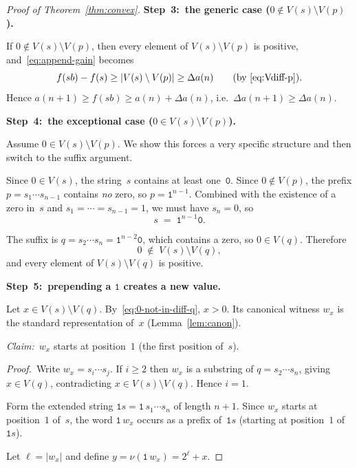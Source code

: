 ﻿\documentclass[11pt,a4paper]{article}
\theoremstyle{plain}
\theoremstyle{definition}
\theoremstyle{remark}
\newcommand{\val}{\nu}
\begin{document}
\begin{proof}[Proof of Theorem~\ref{thm:convex}]
\medskip
\textbf{Step~3:\ the generic case ($0\notin V(s)\setminus V(p)$).}

If $0\notin V(s)\setminus V(p)$, then every element of
$V(s)\setminus V(p)$ is positive, and~\eqref{eq:append-gain}
becomes
\[
  f(sb)-f(s)\ge|V(s)\setminus V(p)|\ge\Delta a(n)
  \qquad\text{(by~\eqref{eq:Vdiff-p})}.
\]
Hence $a(n+1)\ge f(sb)\ge a(n)+\Delta a(n)$, i.e.\
$\Delta a(n+1)\ge\Delta a(n)$.

\medskip
\textbf{Step~4:\ the exceptional case ($0\in V(s)\setminus V(p)$).}

Assume $0\in V(s)\setminus V(p)$.  We show this forces a very
specific structure and then switch to the suffix argument.

Since $0\in V(s)$, the string~$s$ contains at least one~$\mathtt{0}$.
Since $0\notin V(p)$, the prefix $p=s_1\cdots s_{n-1}$ contains
\emph{no} zero, so $p=\mathtt{1}^{n-1}$.  Combined with the existence
of a zero in~$s$ and $s_1=\cdots=s_{n-1}=1$, we must have $s_n=0$, so
\begin{equation}\label{eq:special-s}
  s\;=\;\mathtt{1}^{n-1}\mathtt{0}.
\end{equation}

The suffix is $q=s_2\cdots s_n=\mathtt{1}^{n-2}\mathtt{0}$, which
contains a zero, so $0\in V(q)$.  Therefore
\begin{equation}\label{eq:0-not-in-diff-q}
  0\;\notin\; V(s)\setminus V(q),
\end{equation}
and every element of $V(s)\setminus V(q)$ is positive.

\medskip
\textbf{Step~5:\ prepending a $\mathtt{1}$ creates a new value.}

Let $x\in V(s)\setminus V(q)$.  By~\eqref{eq:0-not-in-diff-q}, $x>0$.
Its canonical witness $w_x$ is the standard representation of~$x$
(Lemma~\ref{lem:canon}).

\textit{Claim:}\ $w_x$ starts at position~$1$ (the first position
of~$s$).

\textit{Proof.}\ Write $w_x=s_i\cdots s_j$.  If $i\ge2$ then
$w_x$ is a substring of $q=s_2\cdots s_n$, giving $x\in V(q)$,
contradicting $x\in V(s)\setminus V(q)$.  Hence $i=1$.

Form the extended string $\mathtt{1}s=\mathtt{1}\,s_1\cdots s_n$ of
length $n+1$.  Since $w_x$ starts at position~$1$ of~$s$, the word
$\mathtt{1}\,w_x$ occurs as a prefix of~$\mathtt{1}s$ (starting at
position~$1$ of~$\mathtt{1}s$).

Let $\ell=|w_x|$ and define $y=\val(\mathtt{1}\,w_x)=2^{\ell}+x$.


\end{proof}
\end{document}
